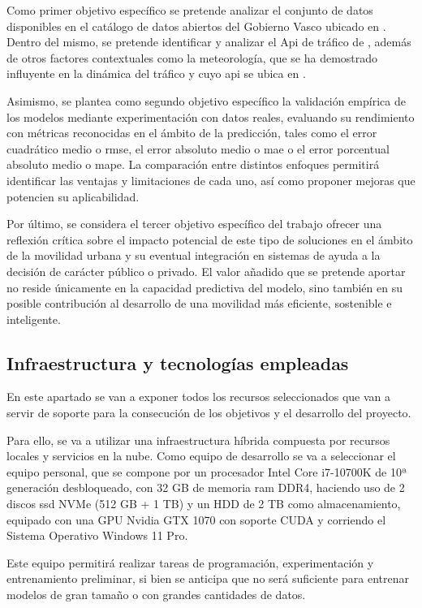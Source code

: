 Como primer objetivo específico se pretende analizar el conjunto de datos disponibles en el catálogo de datos abiertos del Gobierno Vasco ubicado en \cite{openDataGv}. Dentro del mismo, se pretende identificar y analizar el Api de tráfico de \cite{apiTraffic}, además de otros factores contextuales como la meteorología, que se ha demostrado influyente en la dinámica del tráfico y cuyo \acrshort{api} se ubica en \cite{apiMeteo}.

Asimismo, se plantea como segundo objetivo específico la validación empírica de los modelos mediante experimentación con datos reales, evaluando su rendimiento con métricas reconocidas en el ámbito de la predicción, tales como el error cuadrático medio o \acrshort{rmse}, el error absoluto medio o \acrshort{mae} o el error porcentual absoluto medio o \acrshort{mape}. La comparación entre distintos enfoques permitirá identificar las ventajas y limitaciones de cada uno, así como proponer mejoras que potencien su aplicabilidad.

Por último, se considera el tercer objetivo específico del trabajo ofrecer una reflexión crítica sobre el impacto potencial de este tipo de soluciones en el ámbito de la movilidad urbana y su eventual integración en sistemas de ayuda a la decisión de carácter público o privado. El valor añadido que se pretende aportar no reside únicamente en la capacidad predictiva del modelo, sino también en su posible contribución al desarrollo de una movilidad más eficiente, sostenible e inteligente.

\subsection{Infraestructura y tecnologías empleadas}

En este apartado se van a exponer todos los recursos seleccionados que van a servir de soporte para la consecución de los objetivos y el desarrollo del proyecto.

Para ello, se va a utilizar una infraestructura híbrida compuesta por recursos locales y servicios en la nube.
Como equipo de desarrollo se va a seleccionar el equipo personal, que se compone por un procesador Intel Core i7-10700K de 10ª generación desbloqueado, con 32 GB de memoria \acrshort{ram} DDR4, haciendo uso de 2 discos \acrshort{ssd} NVMe (512 GB + 1 TB) y un HDD de 2 TB como almacenamiento, equipado con una GPU Nvidia GTX 1070 con soporte CUDA y corriendo el Sistema Operativo Windows 11 Pro.

Este equipo permitirá realizar tareas de programación, experimentación y entrenamiento preliminar, si bien se anticipa que no será suficiente para entrenar modelos de gran tamaño o con grandes cantidades de datos.

